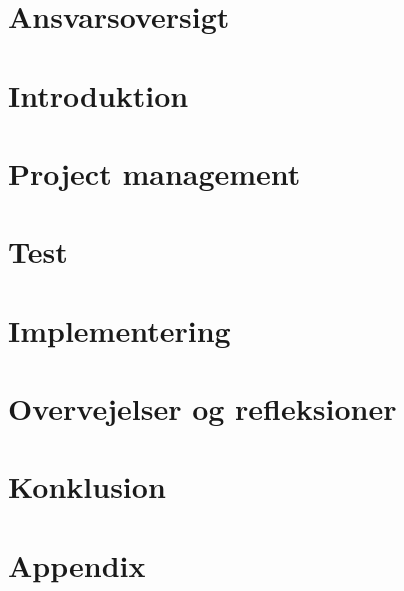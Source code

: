 
\newpage
{}
\setcounter{page}{1}

\setcounter{tocdepth}{2}
\tableofcontents

\newpage
\section{Ansvarsoversigt}


\newpage
\section{Introduktion}


\section{Project management}




\section{Test}




\section{Implementering}




\section{Overvejelser og refleksioner}





\section{Konklusion}


\newpage
\section{Appendix}

%


